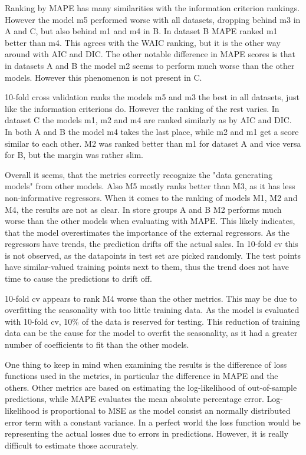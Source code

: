 \documentclass[english, 12pt, a4paper, sci, utf8, a-1b, online]{aaltothesis}
\begin{document}
Ranking by MAPE has many similarities with the information criterion rankings. However the model m5 performed worse with all 
datasets, dropping behind m3 in A and C, but also behind m1 and m4 in B. In dataset B MAPE ranked m1 better than m4. This agrees
with the WAIC ranking, but it is the other way around with AIC and DIC. The other notable difference in MAPE scores is that in datasets
A and B the model m2 seems to perform much worse than the other models. However this phenomenon is not present in C. 

10-fold cross validation ranks the models m5 and m3 the best in all datasets, just like the information criterions do. However the
ranking of the rest varies. In dataset C the models m1, m2 and m4 are ranked similarly as by AIC and DIC. In both A and B the model m4
takes the last place, while m2 and m1 get a score similar to each other. M2 was ranked better than m1 for dataset A and vice versa for B, but
the margin was rather slim.


Overall it seems, that the metrics correctly recognize the "data generating models" from other models. Also M5 mostly ranks better than M3, as it has less 
non-informative regressors. When it comes to the ranking of models M1, M2 and M4, the results are not as clear. In store groups A and B M2 performs much worse than the other models when evaluating with MAPE. This likely indicates, that the model overestimates the importance of the external regressors. As the regressors have
trends, the prediction drifts off the actual sales. In 10-fold cv this is not observed, as the datapoints in test set are picked randomly. The test points have similar-valued training points next to them, thus the trend does not have time to cause the predictions to drift off.

10-fold cv appears to rank M4 worse than the other metrics. This may be due to overfitting the seasonality with too little training data. As the model is evaluated with 10-fold cv, 10\% of the data is reserved for testing. This reduction of training data can be the cause for the model to overfit the seasonality, as it had a greater number of coefficients to fit than the other models.


One thing to keep in mind when examining the results is the difference of loss functions used in the metrics, in particular the difference in MAPE and the others. Other metrics are based on estimating the log-likelihood of out-of-sample predictions, while MAPE evaluates the mean absolute percentage error. Log-likelihood is proportional to MSE as the model consist an normally distributed error term with a constant variance. In a perfect world the loss function would be representing the actual losses due to errors in predictions. However, it is really difficult to estimate those accurately. 
\end{document}

